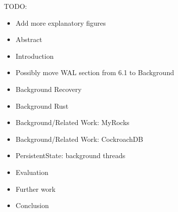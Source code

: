 \color{purple}
TODO:
\begin{itemize}
  \item Add more explanatory figures

  \item Abstract
  \item Introduction

  \item Possibly move WAL section from 6.1 to Background

  \item Background Recovery
  \item Background Rust

  \item Background/Related Work: MyRocks
  \item Background/Related Work: CockroachDB

  \item PersistentState: background threads

  \item Evaluation
  \item Further work
  \item Conclusion
\end{itemize}

